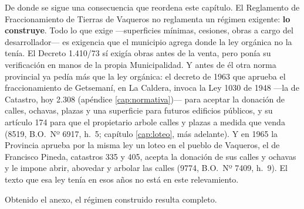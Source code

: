 De donde se sigue una consecuencia que reordena este capítulo. El Reglamento de Fraccionamiento de Tierras de Vaqueros no reglamenta un régimen exigente: \textbf{lo construye}. Todo lo que exige ---superficies mínimas, cesiones, obras a cargo del desarrollador--- es exigencia que el municipio agrega donde la ley orgánica no la tenía. El Decreto 1.410/73 sí exigía obras antes de la venta, pero ponía su verificación en manos de la propia Municipalidad. Y antes de él otra norma provincial ya pedía más que la ley orgánica: el decreto de 1963 que aprueba el fraccionamiento de Getsemaní, en La Caldera, invoca la Ley 1030 de 1948 ---la de Catastro, hoy 2.308 (apéndice \ref{cap:normativa})--- para aceptar la donación de calles, ochavas, plazas y una superficie para futuros edificios públicos, y su artículo 174 para que el propietario arbole calles y plazas a medida que venda (8519, B.O.\ Nº 6917, h.\ 5; capítulo \ref{cap:loteo}, más adelante). Y en 1965 la Provincia aprueba por la misma ley un loteo en el pueblo de Vaqueros, el de Francisco Pineda, catastros 335 y 405, acepta la donación de sus calles y ochavas y le impone abrir, abovedar y arbolar las calles (9774, B.O.\ Nº 7409, h.\ 9). El texto que esa ley tenía en esos años no está en este relevamiento.

Obtenido el anexo, el régimen construido resulta completo.

